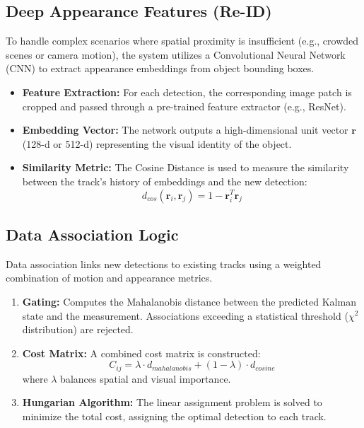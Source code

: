 \documentclass[12pt,a4paper]{report}
\begin{document}
\subsection{Deep Appearance Features (Re-ID)}
To handle complex scenarios where spatial proximity is insufficient (e.g., crowded scenes or camera motion), the system utilizes a Convolutional Neural Network (CNN) to extract appearance embeddings from object bounding boxes.
\begin{itemize}
    \item \textbf{Feature Extraction:} For each detection, the corresponding image patch is cropped and passed through a pre-trained feature extractor (e.g., ResNet).
    \item \textbf{Embedding Vector:} The network outputs a high-dimensional unit vector $\mathbf{r}$ (128-d or 512-d) representing the visual identity of the object.
    \item \textbf{Similarity Metric:} The Cosine Distance is used to measure the similarity between the track's history of embeddings and the new detection:
    \begin{equation}
    d_{cos}(\mathbf{r}_i, \mathbf{r}_j) = 1 - \mathbf{r}_i^T \mathbf{r}_j
    \end{equation}
\end{itemize}

\subsection{Data Association Logic}
Data association links new detections to existing tracks using a weighted combination of motion and appearance metrics.
\begin{enumerate}
    \item \textbf{Gating:} Computes the Mahalanobis distance between the predicted Kalman state and the measurement. Associations exceeding a statistical threshold ($\chi^2$ distribution) are rejected.
    \item \textbf{Cost Matrix:} A combined cost matrix is constructed:
    \begin{equation}
    C_{ij} = \lambda \cdot d_{mahalanobis} + (1 - \lambda) \cdot d_{cosine}
    \end{equation}
    where $\lambda$ balances spatial and visual importance.
    \item \textbf{Hungarian Algorithm:} The linear assignment problem is solved to minimize the total cost, assigning the optimal detection to each track.
\end{enumerate}
\end{document}
